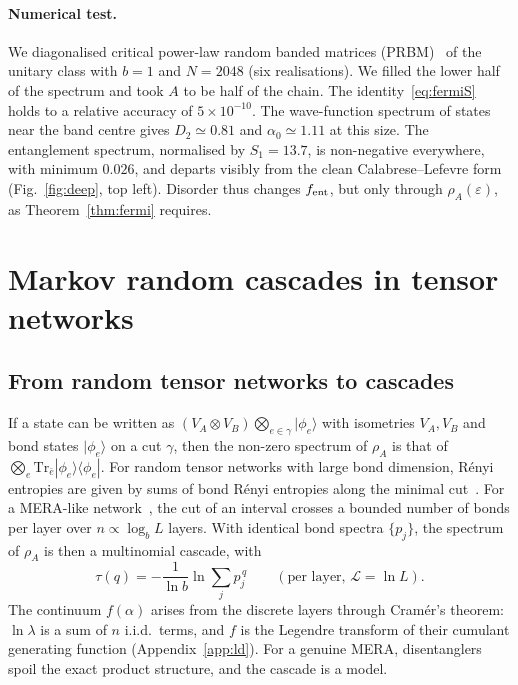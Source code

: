 \documentclass[11pt]{article}
\theoremstyle{definition}\newtheorem{definition}{Definition}[section]
\theoremstyle{remark}\newtheorem*{remark}{Remark}
\newcommand{\Tr}{\mathrm{Tr}}
\newcommand{\cL}{\mathcal{L}}
\begin{document}
\paragraph{Numerical test.} We diagonalised critical power-law random banded matrices (PRBM)~\cite{PRBM}
of the unitary class with $b=1$ and $N=2048$ (six realisations). We filled the lower half of the spectrum and
took $A$ to be half of the chain. The identity~\eqref{eq:fermiS} holds to a relative accuracy of
$5\times10^{-10}$. The wave-function spectrum of states near the band centre gives $D_2\simeq0.81$ and
$\alpha_0\simeq1.11$ at this size. The entanglement spectrum, normalised by $S_1=13.7$, is non-negative
everywhere, with minimum $0.026$, and departs visibly from the clean Calabrese--Lefevre form
(Fig.~\ref{fig:deep}, top left). Disorder thus changes $f_{\rm ent}$, but only through $\rho_A(\varepsilon)$, as
Theorem~\ref{thm:fermi} requires.

\section{Markov random cascades in tensor networks}
\label{sec:markov}

\subsection{From random tensor networks to cascades}
If a state can be written as $(V_A\otimes V_B)\bigotimes_{e\in\gamma}|\phi_e\rangle$ with isometries $V_A,V_B$ and bond
states $|\phi_e\rangle$ on a cut $\gamma$, then the non-zero spectrum of $\rho_A$ is that of
$\bigotimes_e\Tr_{\bar e}|\phi_e\rangle\langle\phi_e|$. For random tensor networks with large bond dimension, R\'enyi
entropies are given by sums of bond R\'enyi entropies along the minimal cut~\cite{HNQTWY}. For a
MERA-like network~\cite{Vidal}, the cut of an interval crosses a bounded number of bonds per layer over
$n\propto\log_bL$ layers. With identical bond spectra $\{p_j\}$, the spectrum of $\rho_A$ is then a multinomial
cascade, with
\begin{equation}
\tau(q)=-\frac{1}{\ln b}\ln\sum_jp_j^{\,q}\qquad(\text{per layer, }\cL=\ln L).
\end{equation}
The continuum $f(\alpha)$ arises from the discrete layers through Cram\'er's theorem: $\ln\lambda$ is a sum of
$n$ i.i.d.\ terms, and $f$ is the Legendre transform of their cumulant generating function (Appendix~\ref{app:ld}).
For a genuine MERA, disentanglers spoil the exact product structure, and the cascade is a model.
\end{document}
